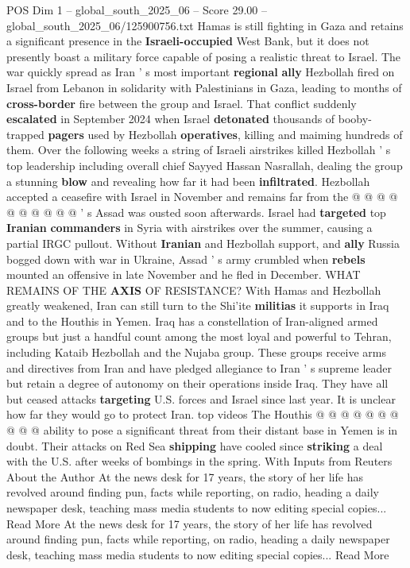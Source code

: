 \begin{textsample}{POS Dim 1 – global\_south\_2025\_06 – Score 29.00 – global\_south\_2025\_06/125900756.txt}
Hamas is still fighting in Gaza and retains a significant presence in the \textbf{Israeli-occupied} West Bank, but it does not presently boast a military force capable of posing a realistic threat to Israel.
The war quickly spread as Iran ' s most important \textbf{regional} \textbf{ally} Hezbollah fired on Israel from Lebanon in solidarity with Palestinians in Gaza, leading to months of \textbf{cross-border} fire between the group and Israel.
That conflict suddenly \textbf{escalated} in September 2024 when Israel \textbf{detonated} thousands of booby-trapped \textbf{pagers} used by Hezbollah \textbf{operatives}, killing and maiming hundreds of them.
Over the following weeks a string of Israeli airstrikes killed Hezbollah ' s top leadership including overall chief Sayyed Hassan Nasrallah, dealing the group a stunning \textbf{blow} and revealing how far it had been \textbf{infiltrated}.
Hezbollah accepted a ceasefire with Israel in November and remains far from the @ @ @ @ @ @ @ @ @ @ ' s Assad was ousted soon afterwards.
Israel had \textbf{targeted} top \textbf{Iranian} \textbf{commanders} in Syria with airstrikes over the summer, causing a partial IRGC pullout.
Without \textbf{Iranian} and Hezbollah support, and \textbf{ally} Russia bogged down with war in Ukraine, Assad ' s army crumbled when \textbf{rebels} mounted an offensive in late November and he fled in December.
WHAT REMAINS OF THE \textbf{AXIS} OF RESISTANCE?
With Hamas and Hezbollah greatly weakened, Iran can still turn to the Shi'ite \textbf{militias} it supports in Iraq and to the Houthis in Yemen.
Iraq has a constellation of Iran-aligned armed groups but just a handful count among the most loyal and powerful to Tehran, including Kataib Hezbollah and the Nujaba group.
These groups receive arms and directives from Iran and have pledged allegiance to Iran ' s supreme leader but retain a degree of autonomy on their operations inside Iraq.
They have all but ceased attacks \textbf{targeting} U.S. forces and Israel since last year.
It is unclear how far they would go to protect Iran. top videos The Houthis @ @ @ @ @ @ @ @ @ @ ability to pose a significant threat from their distant base in Yemen is in doubt.
Their attacks on Red Sea \textbf{shipping} have cooled since \textbf{striking} a deal with the U.S. after weeks of bombings in the spring.
With Inputs from Reuters About the Author At the news desk for 17 years, the story of her life has revolved around finding pun, facts while reporting, on radio, heading a daily newspaper desk, teaching mass media students to now editing special copies...
Read More At the news desk for 17 years, the story of her life has revolved around finding pun, facts while reporting, on radio, heading a daily newspaper desk, teaching mass media students to now editing special copies...
Read More

\end{textsample}
